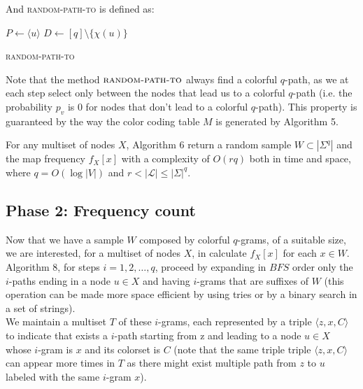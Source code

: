 And \textsc{random-path-to} is defined as:

\begin{algorithm}[h]
	\small
	\DontPrintSemicolon
	$P\gets \langle u \rangle$\;
	$D\gets [q] \setminus \{\chi(u)\}$\;
	\caption{\textsc{random-path-to}}
	\label{alg:randomsample}
	\label{alg:sample}
\end{algorithm}

Note that the method $\textsc{random-path-to}$ always find a colorful $q$-path,
as we at each step select only between the nodes that lead us to a colorful $q$-path
(i.e. the probability $p_{v}$ is $0$ for nodes that don't lead to a colorful $q$-path).
This property is guaranteed by the way the color coding table $M$ is generated by Algorithm 5.

\begin{lemma}
	For any multiset of nodes $X$, 
	Algorithm 6 return a random sample $W \subset |\Sigma^{q}|$ and the map frequency $f_{X}[x]$
	with a complexity of $O(rq)$ both in time and space, 
	where $q = O(\log |V|)$ and $r < |\mathcal{L}| \leq |\Sigma|^{q}$.
\end{lemma}

\clearpage
\subsection*{Phase 2: Frequency count}

Now that we have a sample $W$ composed by colorful $q$-grams, of a suitable size, 
we are interested, for a multiset of nodes $X$, in calculate $f_{X}[x]$ for each $x \in W$.
Algorithm 8, for steps $i = 1, 2, \ldots, q$, proceed by expanding in $BFS$ order only the
$i$-paths ending in a node $u \in X$ and having $i$-grams that are suffixes of $W$
(this operation can be made more space efficient by using tries or by a binary search in a set of strings).\\

We maintain a multiset $T$ of these $i$-grams, each represented by a triple $\langle z, x, C \rangle$
to indicate that exists a $i$-path starting from z and leading to a node $u \in X$ whose $i$-gram is $x$
and its colorset is $C$ (note that the same triple triple $\langle z, x, C \rangle$ can appear more times in $T$ 
as there might exist multiple path from $z$ to $u$ labeled with the same $i$-gram $x$).\\


